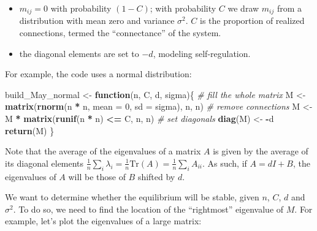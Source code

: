 \documentclass[]{book}
\newenvironment{Shaded}{\begin{snugshade}}{\end{snugshade}}
\newcommand{\CommentTok}[1]{\textcolor[rgb]{0.56,0.35,0.01}{\textit{#1}}}
\newcommand{\ControlFlowTok}[1]{\textcolor[rgb]{0.13,0.29,0.53}{\textbf{#1}}}
\newcommand{\DataTypeTok}[1]{\textcolor[rgb]{0.13,0.29,0.53}{#1}}
\newcommand{\DecValTok}[1]{\textcolor[rgb]{0.00,0.00,0.81}{#1}}
\newcommand{\KeywordTok}[1]{\textcolor[rgb]{0.13,0.29,0.53}{\textbf{#1}}}
\newcommand{\NormalTok}[1]{#1}
\newcommand{\OperatorTok}[1]{\textcolor[rgb]{0.81,0.36,0.00}{\textbf{#1}}}
\newcommand{\StringTok}[1]{\textcolor[rgb]{0.31,0.60,0.02}{#1}}
\providecommand{\tightlist}{%
  \setlength{\itemsep}{0pt}\setlength{\parskip}{0pt}}
\begin{document}
\begin{itemize}
\tightlist
\item
  \(m_{ij} = 0\) with probability \((1-C)\); with probability \(C\) we draw \(m_{ij}\) from a distribution with mean zero and variance \(\sigma^2\). \(C\) is the proportion of realized connections, termed the ``connectance'' of the system.
\item
  the diagonal elements are set to \(-d\), modeling self-regulation.
\end{itemize}

For example, the code uses a normal distribution:

\begin{Shaded}
\begin{Highlighting}[]
\NormalTok{build_May_normal <-}\StringTok{ }\ControlFlowTok{function}\NormalTok{(n, C, d, sigma)\{}
  \CommentTok{# fill the whole matrix}
\NormalTok{  M <-}\StringTok{ }\KeywordTok{matrix}\NormalTok{(}\KeywordTok{rnorm}\NormalTok{(n }\OperatorTok{*}\StringTok{ }\NormalTok{n, }\DataTypeTok{mean =} \DecValTok{0}\NormalTok{, }\DataTypeTok{sd =}\NormalTok{ sigma), n, n)}
  \CommentTok{# remove connections }
\NormalTok{  M <-}\StringTok{ }\NormalTok{M }\OperatorTok{*}\StringTok{ }\KeywordTok{matrix}\NormalTok{(}\KeywordTok{runif}\NormalTok{(n }\OperatorTok{*}\StringTok{ }\NormalTok{n) }\OperatorTok{<=}\StringTok{ }\NormalTok{C, n, n)}
  \CommentTok{# set diagonals}
  \KeywordTok{diag}\NormalTok{(M) <-}\StringTok{ }\OperatorTok{-}\NormalTok{d}
  \KeywordTok{return}\NormalTok{(M)}
\NormalTok{\}}
\end{Highlighting}
\end{Shaded}

Note that the average of the eigenvalues of a matrix \(A\) is given by the average of its diagonal elements \(\frac{1}{n}\sum_i \lambda_i = \frac{1}{n} \text{Tr}(A) = \frac{1}{n} \sum_i A_{ii}\). As such, if \(A = dI + B\), the eigenvalues of \(A\) will be those of \(B\) shifted by \(d\).

We want to determine whether the equilibrium will be stable, given \(n\), \(C\), \(d\) and \(\sigma^2\). To do so, we need to find the location of the ``rightmost'' eigenvalue of \(M\). For example, let's plot the eigenvalues of a large matrix:
\end{document}
